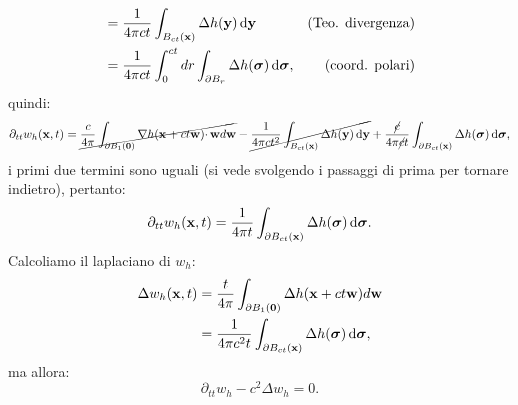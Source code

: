 \begin{dimostrazione}
\begin{align*}
                                                                                                                                           & =\frac{1}{4\pi ct}\int _{B_{ct}(\mathbf{x})} \Delta h(\mathbf{y}) \,\mathrm d \mathbf{y}                                                                                                                                            & \text{(Teo. divergenza)} \\
                                                                                                                                           & =\frac{1}{4\pi ct}\int _{0}^{ct} dr\int _{\partial B_{r}} \Delta h(\bm{\sigma}) \,\mathrm d \bm{\sigma} ,                                                                                                                 & \text{(coord. polari)}
    \end{align*}
    quindi:
    \begin{equation*}
        \partial _{tt} w_{h}(\mathbf{x} ,t) =\cancel{\frac{c}{4\pi }\int _{\partial B_{1}(\mathbf{0})} \nabla h(\mathbf{x} +ct\mathbf{w}) \cdotp \mathbf{w} d\mathbf{w}} -\cancel{\frac{1}{4\pi ct^{2}}\int _{B_{ct}(\mathbf{x})} \Delta h(\mathbf{y}) \,\mathrm d \mathbf{y}} +\frac{\cancel{c}}{4\pi \cancel{c} t}\int _{\partial B_{ct}(\mathbf{x})} \Delta h(\bm{\sigma}) \,\mathrm d \bm{\sigma} ,
    \end{equation*}
    i primi due termini sono uguali (si vede svolgendo i passaggi di prima per tornare indietro), pertanto:
    \begin{equation*}
        \partial _{tt} w_{h}(\mathbf{x} ,t) =\frac{1}{4\pi t}\int _{\partial B_{ct}(\mathbf{x})} \Delta h(\bm{\sigma}) \,\mathrm d \bm{\sigma} .
    \end{equation*}
    Calcoliamo il laplaciano di $\displaystyle w_{h}$:
    \begin{align*}
        \Delta w_{h}(\mathbf{x} ,t) & =\frac{t}{4\pi }\int _{\partial B_{1}(\mathbf{0})} \Delta h(\mathbf{x} +ct\mathbf{w}) d\mathbf{w} \\
                            & =\frac{1}{4\pi c^{2} t}\int _{\partial B_{ct}(\mathbf{x})} \Delta h(\bm{\sigma}) \,\mathrm d \bm{\sigma} ,
    \end{align*}
    ma allora:
    \begin{equation*}
        \partial _{tt} w_{h} -c^{2} \Delta w_{h} =0.
    \end{equation*}
\end{dimostrazione}
